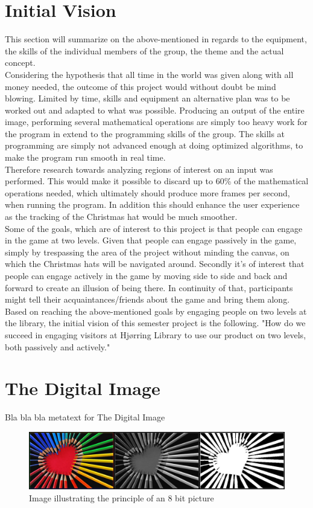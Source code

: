 \section{Initial Vision}
This section will summarize on the above-mentioned in regards to the equipment, the skills of the individual members of the group, the theme and the actual concept.\\
Considering the hypothesis that all time in the world was given along with all money needed, the outcome of this project would without doubt be mind blowing. Limited by time, skills and equipment an alternative plan was to be worked out and adapted to what was possible. Producing an output of the entire image, performing several mathematical operations are simply too heavy work for the program in extend to the programming skills of the group. The skills at programming are simply not advanced enough at doing optimized algorithms, to make the program run smooth in real time. \\
Therefore research towards analyzing regions of interest on an input was performed. This would make it possible to discard up to 60{\%} of the mathematical operations needed, which ultimately should produce more frames per second, when running the program. In addition this should enhance the user experience as the tracking of the Christmas hat would be much smoother.
\\
Some of the goals, which are of interest to this project is that people can engage in the game at two levels. Given that people can engage passively in the game, simply by trespassing the area of the project without minding the canvas, on which the Christmas hats will be navigated around. Secondly it's of interest that people can engage actively in the game by moving side to side and back and forward to create an illusion of being there. In continuity of that, participants might tell their acquaintances/friends about the game and bring them along.
\\
Based on reaching the above-mentioned goals by engaging people on two levels at the library, the initial vision of this semester project is the following. "How do we succeed in engaging visitors at Hj{\o}rring Library to use our product on two levels, both passively and actively."

\section{The Digital Image}
Bla bla bla metatext for The Digital Image
\begin{figure}[htbp]
\centering
\includegraphics[width=1.00\textwidth]{Pictures/Theory/ColoredToGrayscaleToBinary.jpg}
\caption{Image illustrating the principle of an 8 bit picture}
\label{fig:ColoredToGrayscaleToBinary}
\end{figure}





